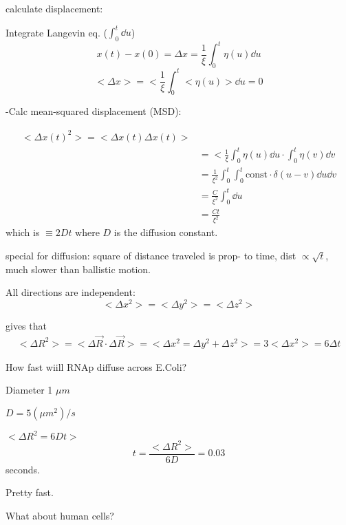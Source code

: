 \documentclass{article}
\begin{document}
calculate displacement: 

Integrate Langevin eq. ($\int_0^t\dd u$)
\begin{equation}
	x(t) - x(0) = \Delta x = \frac{1}{\xi}\int _0^t\eta (u)\dd u
\end{equation}
\begin{equation}
	<\Delta x> = <\frac{1}{\xi}\int_0^t<\eta(u)>\dd u = 0
\end{equation}

-Calc mean-squared displacement (MSD):

\begin{equation}
	\begin{split}
	<\Delta x (t)^2> = <\Delta x(t)\Delta x(t)> \\
	&= <\frac{1}{\xi}\int_0^t\eta(u)\dd u \cdot \int_0^t \eta (v)\dd v\\
	&= \frac{1}{\xi^2} \int_0^t \int_0^t \text{const} \cdot\delta (u-v)\dd u \dd v \\
	&= \frac{C}{\xi^2} \int_0^t \dd u \\
	&= \frac{Ct}{\xi^2}
	\end{split}
\end{equation}
which is $\equiv 2Dt$ where $D$ is the diffusion constant. 

special for diffusion: square of distance traveled is prop- to time, dist $\propto \sqrt t$, much slower than ballistic motion. 


All directions are independent: 
\begin{equation}
	<\Delta x^2>
	=<\Delta y^2>
	=<\Delta z^2>
\end{equation}

gives that 
\begin{equation}
	\begin{split}
	<\Delta R^2> = <\Delta \vec R \cdot \Delta \vec R > = <\Delta x^2 = \Delta y ^2 + \Delta z ^ 2> = 3 <\Delta x ^ 2> = 6 \Delta t
	\end{split}
\end{equation}

How fast wiill RNAp diffuse across E.Coli? 

Diameter 1 $\mu m $

$D = 5(\mu  m ^2)/s$

$<\Delta R^2 = 6Dt>$
 \begin{equation}
	t = \frac{<\Delta R^2>}{6D} = 0.03
\end{equation}
	seconds. 

	Pretty fast. 

What about human cells? 
\end{document}
